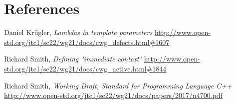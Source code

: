 \documentclass{wg21}
\begin{document}
\section{References}
\renewcommand{\section}[2]{}%
\begin{thebibliography}{9}

    Daniel Kr{\"u}gler,
    \emph{Lambdas in template parameters}\newline
    \url{http://www.open-std.org/jtc1/sc22/wg21/docs/cwg_defects.html#1607}

    Richard Smith,
    \emph{Defining "immediate context"}\newline
    \url{http://www.open-std.org/jtc1/sc22/wg21/docs/cwg_active.html#1844}

    Richard Smith,
    \emph{Working Draft, Standard for Programming Language C++}\newline
    \url{http://www.open-std.org/jtc1/sc22/wg21/docs/papers/2017/n4700.pdf}

\end{thebibliography}
\end{document}
